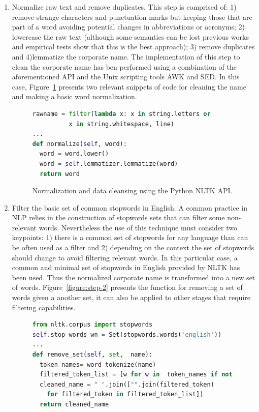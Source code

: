 \documentclass{llncs}
\begin{document}
\begin{enumerate}
 \item Normalize raw text and remove duplicates. This step is comprised of: 1) remove strange characters and punctuation marks but keeping 
 those that are part of a word avoiding potential changes in  abbreviations or acronyms; 2) lowercase the raw text (although some semantics can 
 be lost previous works and empirical tests show that this is the best approach); 3) remove duplicates and 4)lemmatize the corporate name. 
 The implementation of this step to clean the corporate name has ben performed using a combination of the aforementioned API and 
 the Unix scripting tools AWK and SED. In this case, Figure~\ref{figure:step-1} presents 
 two relevant snippets of code for cleaning the name and making a basic word normalization. 
 
\begin{figure}[!h]
\begin{center}
\begin{lstlisting}[language=Python]        
rawname = filter(lambda x: x in string.letters or 
	      x in string.whitespace, line)
...
def normalize(self, word):
  word = word.lower()
  word = self.lemmatizer.lemmatize(word)
  return word
\end{lstlisting}
\caption{Normalization and data cleansing using the Python NLTK API.}
\label{figure:step-1}
\end{center}
\end{figure}


   

\item Filter the basic set of common stopwords in English. A common practice in NLP relies in the construction 
of stopwords sets that can filter some non-relevant words. Nevertheless the use of this technique must 
consider two keypoints: 1) there is a common set of stopwords for any language than can be often used as a filter and 
2) depending on the context the set of stopwords should change to avoid filtering relevant words. In this particular 
case, a common and minimal set of stopwords in English provided by NLTK has been used. Thus the normalized corporate name is 
transformed into a new set of words. Figure~\ref{figure:step-2} presents the function for removing a set of 
words given a another set, it can also be applied to other stages that require filtering capabilities.

\begin{figure}[!h]
\begin{center}
\begin{lstlisting}[language=Python] 
from nltk.corpus import stopwords
self.stop_words_wn = Set(stopwords.words('english'))
...
def remove_set(self, set,  name): 
  token_names= word_tokenize(name)       
  filtered_token_list = [w for w in  token_names if not w in set ]
  cleaned_name = " ".join(["".join(filtered_token) 
    for filtered_token in filtered_token_list])
  return cleaned_name
  

\end{lstlisting}
\end{center}
\end{figure}
\end{enumerate}
\end{document}
